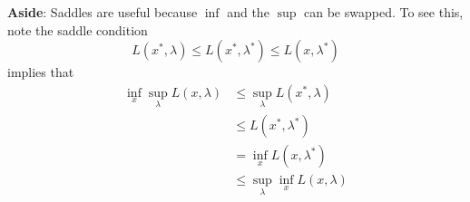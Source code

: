 \textbf{Aside}: Saddles are useful because $\inf$ and the $\sup$ can
be swapped. To see this, note the saddle condition
\[L(x^*, \lambda) \leq L(x^*, \lambda^*) \leq L(x, \lambda^*)\]
implies that
\begin{align*}
\inf_x \sup_\lambda L(x,\lambda)
&\leq \sup_\lambda L(x^*, \lambda)\\
&\leq L(x^*, \lambda^*) \\
&= \inf_x L(x, \lambda^*) \\
&\leq \sup_\lambda \inf_x L(x,\lambda)
\end{align*}
